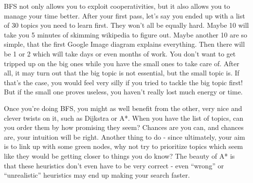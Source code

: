 BFS not only allows you to exploit cooperativities, but it also allows you to manage your
time better. After your first pass, let's say you ended up with a list of 30 topics you
need to learn first. They won't all be equally hard.  Maybe 10 will take you 5 minutes of
skimming wikipedia to figure out. Maybe another 10 are so simple, that the first Google
Image diagram explains everything. Then there will be 1 or 2 which will take days or even
months of work. You don't want to get tripped up on the big ones while you have the small
ones to take care of. After all, it may turn out that the big topic is not essential, but
the small topic is. If that's the case, you would feel very silly if you tried to tackle
the big topic first! But if the small one proves useless, you haven't really lost much
energy or time.

\thispagestyle{empty}

Once you're doing BFS, you might as well benefit from the other, very nice and clever
twists on it, such as Dijkstra or A*. When you have the list of topics, can you order them
by how promising they seem? Chances are you can, and chances are, your intuition will be
right. Another thing to do - since ultimately, your aim is to link up with some green
nodes, why not try to prioritize topics which seem like they would be getting closer to
things you do know? The beauty of A* is that these heuristics don't even have to be very
correct - even ``wrong'' or ``unrealistic'' heuristics may end up making your search
faster.
